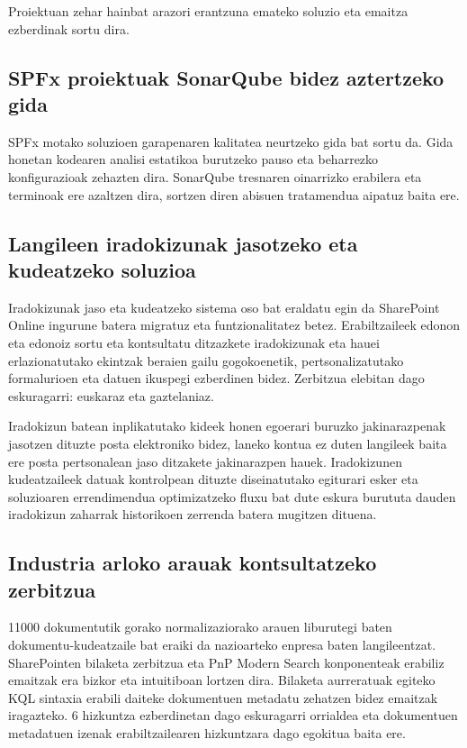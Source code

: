 Proiektuan zehar hainbat arazori erantzuna emateko soluzio eta emaitza ezberdinak sortu dira.

\subsection{SPFx proiektuak SonarQube bidez aztertzeko gida}
SPFx motako soluzioen garapenaren kalitatea neurtzeko gida bat sortu da. Gida
honetan kodearen analisi estatikoa burutzeko pauso eta beharrezko konfigurazioak
zehazten dira. SonarQube tresnaren oinarrizko erabilera eta terminoak ere azaltzen
dira, sortzen diren abisuen tratamendua aipatuz baita ere.
\subsection{Langileen iradokizunak jasotzeko eta kudeatzeko soluzioa}
Iradokizunak jaso eta kudeatzeko sistema oso bat eraldatu egin da SharePoint Online ingurune batera migratuz eta funtzionalitatez betez. Erabiltzaileek edonon eta edonoiz sortu eta kontsultatu ditzazkete iradokizunak eta hauei erlazionatutako ekintzak beraien gailu gogokoenetik, pertsonalizatutako formalurioen eta datuen ikuspegi ezberdinen bidez. Zerbitzua elebitan dago eskuragarri: euskaraz eta gaztelaniaz. 

Iradokizun batean inplikatutako kideek honen egoerari buruzko jakinarazpenak jasotzen dituzte posta elektroniko bidez, laneko kontua ez duten langileek baita ere posta pertsonalean jaso ditzakete jakinarazpen hauek. Iradokizunen kudeatzaileek datuak kontrolpean dituzte diseinatutako egiturari esker eta soluzioaren errendimendua optimizatzeko fluxu bat dute eskura burututa dauden iradokizun zaharrak historikoen zerrenda batera mugitzen dituena.

\subsection{Industria arloko arauak kontsultatzeko zerbitzua}
11000 dokumentutik gorako normalizaziorako arauen liburutegi baten dokumentu-kudeatzaile bat eraiki da nazioarteko enpresa baten langileentzat. SharePointen bilaketa zerbitzua eta PnP Modern Search konponenteak erabiliz emaitzak era bizkor eta intuitiboan lortzen dira. Bilaketa aurreratuak egiteko KQL sintaxia erabili daiteke dokumentuen metadatu zehatzen bidez emaitzak iragazteko. 6 hizkuntza ezberdinetan dago eskuragarri orrialdea eta dokumentuen metadatuen izenak erabiltzailearen hizkuntzara dago egokitua baita ere. 

